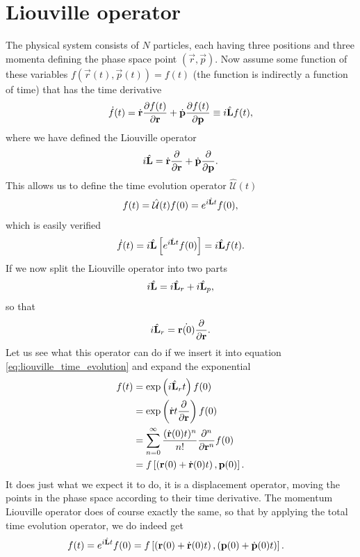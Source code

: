 \section{Liouville operator}
\label{sec:liouville_operator}
The physical system consists of $N$ particles, each having three positions and three momenta defining the phase space point $(\vec r, \vec p)$. Now assume some function of these variables $f(\vec r(t), \vec p(t)) = f(t)$ (the function is indirectly a function of time) that has the time derivative
\begin{align}
	\dot f(t) = \dot {\mathbf r}\frac{\partial f(t)}{\partial \mathbf r} + \dot {\mathbf p}\frac{\partial f(t)}{\partial \mathbf p} \equiv i\hat{\mathbf L} f(t),
\end{align}
where we have defined the Liouville operator
\begin{align}
	i\hat{\mathbf L} = \dot{\mathbf r}\frac{\partial }{\partial \mathbf r} + \dot{\mathbf p}\frac{\partial }{\partial \mathbf p}.
\end{align}
This allows us to define the time evolution operator $\hat{\mathcal U}(t)$
\begin{align}
	\label{eq:liouville_time_evolution}
	f(t) = \hat{\mathcal U}(t)f(0) = e^{i\hat{\mathbf L} t}f(0),
\end{align}
which is easily verified
\begin{align}
	\dot f(t) = i\hat{\mathbf L} \left[e^{i\hat{\mathbf L} t}f(0)\right] = i\hat{\mathbf L} f(t).
\end{align}
If we now split the Liouville operator into two parts
\begin{align}
	i\hat{\mathbf L} = i\hat{\mathbf L}_r + i\hat{\mathbf L}_p,
\end{align}
so that
\begin{align}
	i\hat{\mathbf L}_r = \dot{\mathbf r(0)}\frac{\partial }{\partial \mathbf r}.
\end{align}
Let us see what this operator can do if we insert it into equation \eqref{eq:liouville_time_evolution} and expand the exponential
\begin{align}
	f(t) &= \exp\left(i\hat{\mathbf L}_r t\right) f(0)\\
	&= \exp\left(\dot{\mathbf r}t\frac{\partial }{\partial \mathbf r}\right)f(0)\\
	&= \sum_{n=0}^\infty \frac{(\dot{\mathbf r}(0)t)^n}{n!}\frac{\partial^n}{\partial \mathbf r^n} f(0)\\
	&= f\left[\left(\mathbf r(0) + \dot{\mathbf r}(0)t\right), \mathbf p(0)\right].
\end{align}
It does just what we expect it to do, it is a displacement operator, moving the points in the phase space according to their time derivative. The momentum Liouville operator does of course exactly the same, so that by applying the total time evolution operator, we do indeed get
\begin{align}
	f(t) &= e^{i\hat{\mathbf L} t}f(0) = f\left[\left(\mathbf r(0) + \dot{\mathbf r}(0)t\right), \left(\mathbf p(0) + \dot{\mathbf p}(0)t\right)\right].
\end{align}

